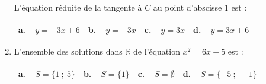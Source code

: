 \documentclass[10pt]{article}
\providecommand{\R}{\mathbb{R}}
\begin{document}
\begin{enumerate}
L'équation réduite de la tangente à $C$ au point d'abscisse 1 est :

\begin{center}
\begin{tabularx}{\linewidth}{|*{4}{X|}}\hline
\textbf{a.~~}$y = -3x + 6$ &\textbf{b.~~}$y = -3x$&\textbf{c.~~}$ y = 3x$  &
\textbf{d.~~}$y = 3x + 6$\\ \hline
\end{tabularx}
\end{center}

\item L'ensemble des solutions dans $\R$ de l'équation $x^2 = 6x - 5$ est :

\begin{center}
\begin{tabularx}{\linewidth}{|*{4}{X|}}\hline
\textbf{a.~~}$S =\{1~;~5\}$ &\textbf{b.~~}$S = \{1\}$&\textbf{c.~~}$S = \emptyset$  &\textbf{d.~~}$S = \{- 5~;~-1\}$\\ \hline
\end{tabularx}
\end{center}
\end{enumerate}

\bigskip
\end{document}
